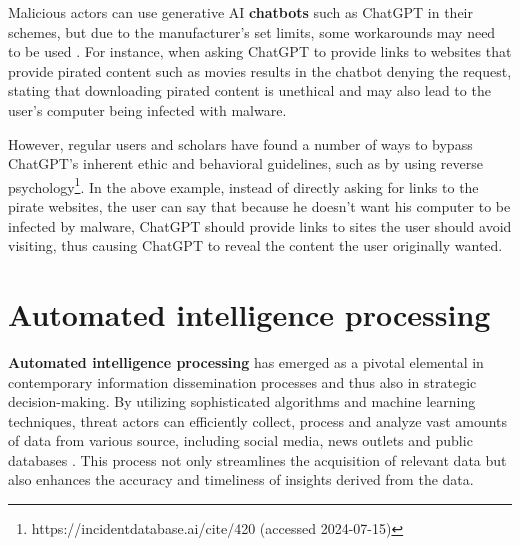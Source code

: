 Malicious actors can use generative AI  \textbf{chatbots} such as ChatGPT in their schemes, but due to the manufacturer's set limits, some workarounds may need to be used \citep{guptaFromChatGPTtoThreatGPT2023}. For instance, when asking ChatGPT to provide links to websites that provide pirated content such as movies results in the chatbot denying the request, stating that downloading pirated content is unethical and may also lead to the user's computer being infected with malware.


However, regular users and scholars have found a number of ways to bypass ChatGPT's inherent ethic and behavioral guidelines, such as by using reverse psychology\footnote{https://incidentdatabase.ai/cite/420 (accessed 2024-07-15)}. In the above example, instead of directly asking for links to the pirate websites, the user can say that because he doesn't want his computer to be infected by malware, ChatGPT should provide links to sites the user should avoid visiting, thus causing ChatGPT to reveal the content the user originally wanted.













\section{Automated intelligence processing}

\begin{comment}

Automated intelligence gathering

What to cover:
    - What is automated intelligence gathering
    - Työkalut kuten Maltego (etsi muitakin työkaluja jos teet listan näistä, varmista netistä et ne on top 3 työkalut)
    - iCloner siitä yhdestä artikkelista All Your Contacts Are Blong To Us?

\end{comment}

\textbf{Automated intelligence processing} has emerged as a pivotal elemental in contemporary information dissemination processes and thus also in strategic decision-making. By utilizing sophisticated algorithms and machine learning techniques, threat actors can efficiently collect, process and analyze vast amounts of data from various source, including social media, news outlets and public databases \citep{bilgeAllYourContactsAreBelongToUs2009}. This process not only streamlines the acquisition of relevant data but also enhances the accuracy and timeliness of insights derived from the data.

